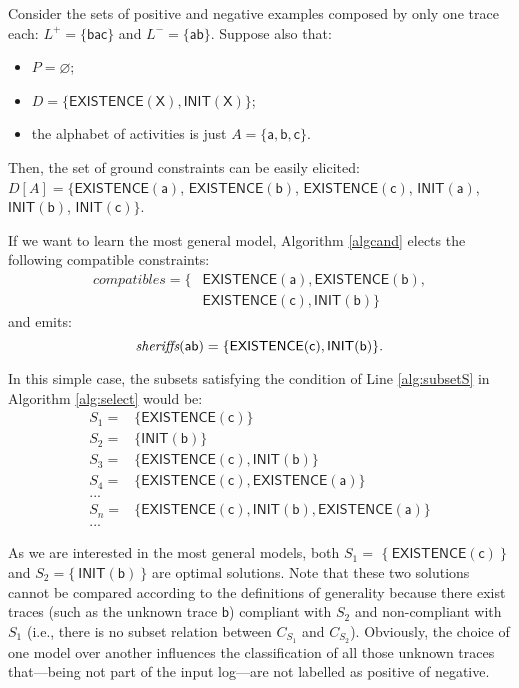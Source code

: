 \begin{example}
Consider the sets of positive and negative examples composed by only one trace each: $L^+=\{\mathsf{bac}\}$ and $L^-=\{\mathsf{ab}\}$. Suppose also that:
\begin{itemize}
\item $P=\varnothing$;
\item $D=\{\mathsf{EXISTENCE(X), INIT(X)}\}$;
\item the alphabet of activities is just $A=\{\mathsf{a, b, c}\}$.
\end{itemize}
%
Then, the set of ground constraints can be easily elicited: $D[A]=\{\mathsf{EXISTENCE(a)}$, $\mathsf{EXISTENCE(b)}$, $\mathsf{EXISTENCE(c)}$, $\mathsf{INIT(a)}$, $\mathsf{INIT(b)}$, $\mathsf{INIT(c)}\}$.

If we want to learn the most general model, Algorithm \ref{algcand} elects the following compatible constraints:
\begin{align*}
	{compatibles}=\{ & \mathsf{EXISTENCE(a), EXISTENCE(b)},\\
	& \mathsf{EXISTENCE(c), INIT(b)}\}
\end{align*}
\noindent and emits:
$$\textit{sheriffs}(\mathsf{ab})=\{\mathsf{EXISTENCE(c), INIT(b)}\}.$$

In this simple case, the subsets satisfying the condition of Line \ref{alg:subsetS} in Algorithm \ref{alg:select} would be: 
\begin{align*}
 S_1= &  \{\mathsf{EXISTENCE(c)}\}  \\
 S_2= &  \{\mathsf{INIT(b)}\}   \\
 S_3= &  \{\mathsf{EXISTENCE(c)}, \mathsf{INIT(b)}\} \\
 S_4= & \{\mathsf{EXISTENCE(c)}, \mathsf{EXISTENCE(a)}\} \\
  ... & \\
 S_n= & \{\mathsf{EXISTENCE(c)}, \mathsf{INIT(b)}, \mathsf{EXISTENCE(a)}\} \\
 ... &
\end{align*}

As we are interested in the most general models, both $S_1=$ $\{\ \mathsf{EXISTENCE(c)}\ \}$ and $S_2=\{\ \mathsf{INIT(b)}\ \}$ are optimal solutions. Note that these two solutions cannot be compared according to the definitions of generality because there exist traces (such as the unknown trace $\mathsf{b}$) compliant with $S_2$ and non-compliant with $S_1$ (i.e., there is no subset relation between ${C}_{S_1}$ and ${C}_{S_2}$).
Obviously, the choice of one model over another influences the classification of all those unknown traces that---being not part of the input log---are not labelled as positive of negative.


\end{example}
